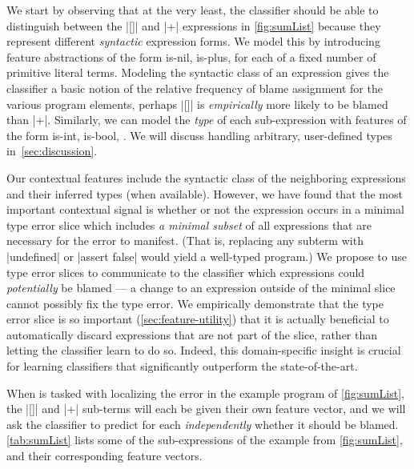 %
We start by observing that
at the very least, the
classifier should be able
to distinguish between the
|[]| and |+| expressions
in \autoref{fig:sumList}
because they represent
different \emph{syntactic}
expression forms.
%
We model this by
introducing feature
abstractions of the form
is-nil, is-plus, \etc for
each of a fixed number of
primitive literal terms.
%
Modeling the syntactic class of an
expression gives the classifier a
basic notion of the relative
frequency of blame assignment
for the various program elements,
\ie perhaps |[]| is
\emph{empirically} more
likely to be blamed than |+|.
%
Similarly, we can model
the \emph{type} of each
sub-expression with features
of the form is-int, is-bool, \etc.
%
We will discuss handling
arbitrary, user-defined types
in~\autoref{sec:discussion}.

%
Our contextual features include the
syntactic class of the neighboring
expressions and their inferred types
(when available).
%
However, we have found that
the most important contextual
signal is whether or not the
expression occurs in
a minimal type error slice
\citep{Tip2001-qp,Haack2003-vc}
which includes \emph{a minimal subset}
of all expressions that are
necessary for the error to manifest.
%
(That is, replacing any subterm
with |undefined| or |assert false|
would yield a well-typed program.)
%
We propose to use type error slices
to communicate to the classifier
which expressions could
\emph{potentially} be blamed --- a
change to an expression outside of
the minimal slice cannot possibly
fix the type error.
%
We empirically demonstrate that
the type error slice is so
important (\autoref{sec:feature-utility})
that it is actually beneficial to
automatically discard expressions
that are not part of the slice,
rather than letting the classifier
learn to do so.
%
Indeed, this domain-specific
insight is crucial for learning
classifiers that significantly
outperform the state-of-the-art.

%
When \toolname is tasked with localizing
the error in the example program of \autoref{fig:sumList},
the |[]| and |+| sub-terms will each be given
their own feature vector, and we will ask the
classifier to predict for each \emph{independently}
whether it should be blamed.
%
\autoref{tab:sumList} lists some
of the sub-expressions of the example
from \autoref{fig:sumList}, and their
corresponding feature vectors.



